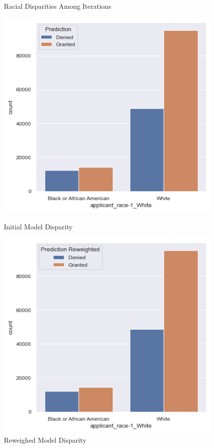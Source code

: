 \begin{figure}[h]
    \centering
    \caption{Racial Disparities Among Iterations}
    \begin{minipage}{0.5\textwidth}
        \centering
        \includegraphics[width=\textwidth]{images/loan_grants_by_protected_attributes/initial.png}
        \caption{Initial Model Disparity}
        \label{fig:Initial_Disparity}
    \end{minipage}\hfill
    \begin{minipage}{0.5\textwidth}
        \centering
        \includegraphics[width=\textwidth]{images/loan_grants_by_protected_attributes/reweighted.png}
        \caption{Reweighed Model Disparity}
        \label{fig:Reweighed_Disparity}
    \end{minipage}
    

\end{figure}

